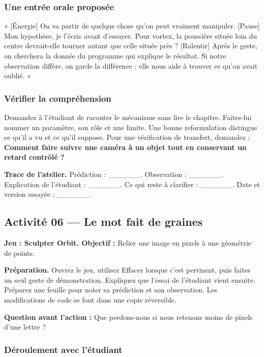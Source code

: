 \documentclass[
  canadien,
  11pt,
  letterpaper,
]{article}
\begin{document}
\subsubsection{Une entrée orale
proposée}\label{une-entruxe9e-orale-proposuxe9e-4}

« {[}Énergie{]} On va partir de quelque chose qu'on peut vraiment
manipuler. {[}Pause{]} Mon hypothèse, je l'écris avant d'essayer. Pour
vortex, la poussière située loin du centre devrait-elle tourner autant
que celle située près ? {[}Ralentir{]} Après le geste, on cherchera la
donnée du programme qui explique le résultat. Si notre observation
diffère, on garde la différence : elle nous aide à trouver ce qu'on
avait oublié. »

\subsubsection{Vérifier la
compréhension}\label{vuxe9rifier-la-compruxe9hension-4}

Demandez à l'étudiant de raconter le mécanisme sans lire le chapitre.
Faites-lui nommer un paramètre, son rôle et une limite. Une bonne
reformulation distingue ce qu'il a vu et ce qu'il suppose. Pour une
vérification de transfert, demandez : \textbf{Comment faire suivre une
caméra à un objet tout en conservant un retard contrôlé ?}

\textbf{Trace de l'atelier.} Prédiction : \_\_\_\_\_\_. Observation :
\_\_\_\_\_\_. Explication de l'étudiant : \_\_\_\_\_\_. Ce qui reste à
clarifier : \_\_\_\_\_\_. Date et version essayée : \_\_\_\_\_\_.

\subsection{Activité 06 --- Le mot fait de
graines}\label{activituxe9-06-le-mot-fait-de-graines}

\textbf{Jeu : Sculpter Orbit. Objectif :} Relier une image en pixels à
une géométrie de points.

\textbf{Préparation.} Ouvrez le jeu, utilisez Effacer lorsque c'est
pertinent, puis faites un seul geste de démonstration. Expliquez que
l'essai de l'étudiant vient ensuite. Préparez une feuille pour noter sa
prédiction et son observation. Les modifications de code se font dans
une copie réversible.

\textbf{Question avant l'action :} Que perdons-nous si nous retenons
moins de pixels d'une lettre ?

\subsubsection{Déroulement avec
l'étudiant}\label{duxe9roulement-avec-luxe9tudiant-5}
\end{document}
